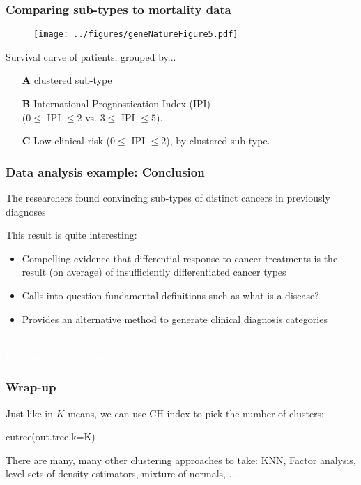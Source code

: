 \documentclass{beamer}
\begin{document}
\begin{frame}[fragile]
\frametitle{Comparing sub-types to mortality data}
\begin{figure}
\centering
  \texttt{[image: ../figures/geneNatureFigure5.pdf]} 
\end{figure}
Survival curve of patients, grouped by...
\begin{itemize}
\item[\textbf{\textcolor{black}{A}}] clustered sub-type
\item[\textbf{\textcolor{black}{B}}] International Prognostication Index (IPI) \\($0 \leq $ IPI $ \leq 2$ vs. 
$3 \leq $ IPI $ \leq 5$).
\item[\textbf{\textcolor{black}{C}}] Low clinical risk ($0 \leq $ IPI $ \leq 2$), by clustered sub-type.
\end{itemize}
\end{frame}

\begin{frame}[fragile]
\frametitle{Data analysis example: Conclusion}
The researchers found convincing sub-types of distinct cancers in previously diagnoses
\vsp

This result is quite interesting:
\begin{itemize}
\item \textcolor<1>{greenmain}{Compelling evidence that differential response to cancer treatments is the result (on average) of
insufficiently differentiated cancer types}
\item \textcolor<2>{greenmain}{Calls into question fundamental definitions such as what is a disease?}
\item \textcolor<3>{greenmain}{Provides an alternative method to generate clinical diagnosis categories}
\end{itemize}

\vsp
\textcolor<4>{greenmain}{\textcolor<-3>{white}{Conclusion: Qualitative {\it symptoms-based} categorization of disease is inadequate for diagnosis and treatment}}
\end{frame}

\begin{frame}[fragile]
\frametitle{Wrap-up}
Just like in $K$-means, we can use CH-index to pick the number of clusters:
\begin{blockcode}
cutree(out.tree,k=K)
\end{blockcode}
\vsp

There are many, many other clustering approaches to take: KNN, Factor analysis, level-sets of density
estimators, mixture of normals, ...
\end{frame}
\end{document}
